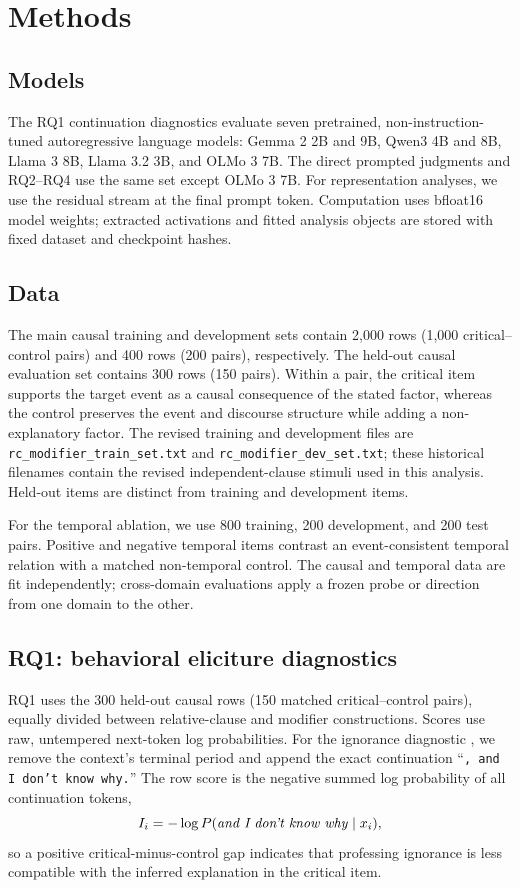 \section{Methods}
\label{sec:methods}

\subsection{Models}
The RQ1 continuation diagnostics evaluate seven pretrained, non-instruction-tuned autoregressive language models: Gemma 2 2B and 9B, Qwen3 4B and 8B, Llama 3 8B, Llama 3.2 3B, and OLMo 3 7B. The direct prompted judgments and RQ2--RQ4 use the same set except OLMo 3 7B. For representation analyses, we use the residual stream at the final prompt token. Computation uses bfloat16 model weights; extracted activations and fitted analysis objects are stored with fixed dataset and checkpoint hashes.

\subsection{Data}
The main causal training and development sets contain 2,000 rows (1,000 critical--control pairs) and 400 rows (200 pairs), respectively. The held-out causal evaluation set contains 300 rows (150 pairs). Within a pair, the critical item supports the target event as a causal consequence of the stated factor, whereas the control preserves the event and discourse structure while adding a non-explanatory factor. The revised training and development files are \texttt{rc\_modifier\_train\_set.txt} and \texttt{rc\_modifier\_dev\_set.txt}; these historical filenames contain the revised independent-clause stimuli used in this analysis. Held-out items are distinct from training and development items.

For the temporal ablation, we use 800 training, 200 development, and 200 test pairs. Positive and negative temporal items contrast an event-consistent temporal relation with a matched non-temporal control. The causal and temporal data are fit independently; cross-domain evaluations apply a frozen probe or direction from one domain to the other.

\subsection{RQ1: behavioral eliciture diagnostics}
RQ1 uses the 300 held-out causal rows (150 matched critical--control pairs), equally divided between relative-clause and modifier constructions. Scores use raw, untempered next-token log probabilities. For the ignorance diagnostic \citep{pan-kehler-2025-pragmatic}, we remove the context's terminal period and append the exact continuation ``\texttt{, and I don't know why.}'' The row score is the negative summed log probability of all continuation tokens,
\begin{equation}
 I_i=-\log P(\text{\emph{and I don't know why}}\mid x_i),
\end{equation}
so a positive critical-minus-control gap indicates that professing ignorance is less compatible with the inferred explanation in the critical item.

